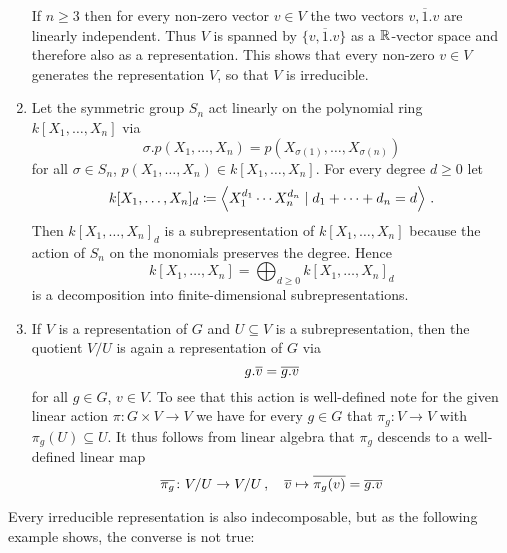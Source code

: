 \begin{example}
\begin{enumerate}
      If $n \geq 3$ then for every non-zero vector $v \in V$ the two vectors $v, \overline{1}.v$ are linearly independent.
      Thus $V$ is spanned by $\{v, \overline{1}.v\}$ as a $\mathbb{R}$-vector space and therefore also as a representation.
      This shows that every non-zero $v \in V$ generates the representation $V$, so that $V$ is irreducible.
    \item
      Let the symmetric group $S_n$ act linearly on the polynomial ring $k[X_1, \dotsc, X_n]$ via
      \[
          \sigma.p(X_1, \dotsc, X_n)
        = p(X_{\sigma(1)}, \dotsc, X_{\sigma(n)})
      \]
      for all $\sigma \in S_n$, $p(X_1, \dotsc, X_n) \in k[X_1, \dotsc, X_n]$.
      For every degree $d \geq 0$ let
      \[
                  k[X_1, \dotsc, X_n]_d
        \coloneqq  \left\langle  X_1^{d_1} \dotsm X_n^{d_n} \mid d_1 + \dotsb + d_n = d  \right\rangle \,.
      \]
      Then $k[X_1, \dotsc, X_n]_d$ is a subrepresentation of $k[X_1, \dotsc, X_n]$ because the action of $S_n$ on the monomials preserves the degree.
      Hence
      \[
          k[X_1, \dotsc, X_n]
        = \bigoplus_{d \geq 0} k[X_1, \dotsc, X_n]_d
      \]
      is a decomposition into finite-dimensional subrepresentations.
    \item
      If $V$ is a representation of $G$ and $U \subseteq V$ is a subrepresentation, then the quotient $V/U$ is again a representation of $G$ via
      \[
          g.\overline{v}
        = \overline{g.v}
      \]
      for all $g \in G$, $v \in V$.
      To see that this action is well-defined note for the given linear action $\pi \colon G \times V \to V$ we have for every $g \in G$ that $\pi_g \colon V \to V$ with $\pi_g(U) \subseteq U$.
      It thus follows from linear algebra that $\pi_g$ descends to a well-defined linear map
      \[
                \overline{\pi_g}
        \colon  V/U
        \to     V/U \,,
        \quad   \overline{v}
        \mapsto \overline{\pi_g(v)}
        =       \overline{g.v}
      \]
  \end{enumerate}
\end{example}


\begin{fluff}
  Every irreducible representation is also indecomposable, but as the following example shows, the converse is not true:
\end{fluff}

